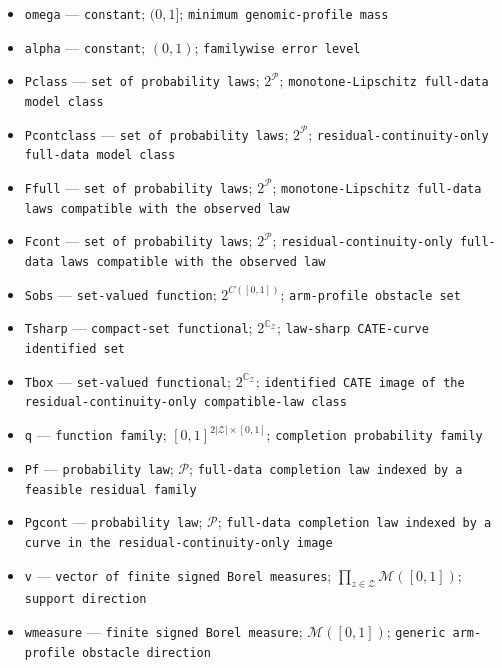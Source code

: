 \documentclass{article}
\begin{document}
\begin{itemize}
  \item \texttt{omega} --- \texttt{constant}; \((0,1]\); \texttt{minimum genomic-\allowbreak{}profile mass}
  \item \texttt{alpha} --- \texttt{constant}; \((0,1)\); \texttt{familywise error level}
  \item \texttt{Pclass} --- \texttt{set of probability laws}; \(2^{\mathcal P}\); \texttt{monotone-\allowbreak{}Lipschitz full-\allowbreak{}data model class}
  \item \texttt{Pcontclass} --- \texttt{set of probability laws}; \(2^{\mathcal P}\); \texttt{residual-\allowbreak{}continuity-\allowbreak{}only full-\allowbreak{}data model class}
  \item \texttt{Ffull} --- \texttt{set of probability laws}; \(2^{\mathcal P}\); \texttt{monotone-\allowbreak{}Lipschitz full-\allowbreak{}data laws compatible with the observed law}
  \item \texttt{Fcont} --- \texttt{set of probability laws}; \(2^{\mathcal P}\); \texttt{residual-\allowbreak{}continuity-\allowbreak{}only full-\allowbreak{}data laws compatible with the observed law}
  \item \texttt{Sobs} --- \texttt{set-\allowbreak{}valued function}; \(2^{C([0,1])}\); \texttt{arm-\allowbreak{}profile obstacle set}
  \item \texttt{Tsharp} --- \texttt{compact-\allowbreak{}set functional}; \(2^{\mathbb C_{\mathcal Z}}\); \texttt{law-\allowbreak{}sharp CATE-\allowbreak{}curve identified set}
  \item \texttt{Tbox} --- \texttt{set-\allowbreak{}valued functional}; \(2^{\mathbb C_{\mathcal Z}}\); \texttt{identified CATE image of the residual-\allowbreak{}continuity-\allowbreak{}only compatible-\allowbreak{}law class}
  \item \texttt{q} --- \texttt{function family}; \([0,1]^{2|\mathcal Z|\times[0,1]}\); \texttt{completion probability family}
  \item \texttt{Pf} --- \texttt{probability law}; \(\mathcal P\); \texttt{full-\allowbreak{}data completion law indexed by a feasible residual family}
  \item \texttt{Pgcont} --- \texttt{probability law}; \(\mathcal P\); \texttt{full-\allowbreak{}data completion law indexed by a curve in the residual-\allowbreak{}continuity-\allowbreak{}only image}
  \item \texttt{v} --- \texttt{vector of finite signed Borel measures}; \(\prod_{z\in\mathcal Z}\mathcal M([0,1])\); \texttt{support direction}
  \item \texttt{wmeasure} --- \texttt{finite signed Borel measure}; \(\mathcal M([0,1])\); \texttt{generic arm-\allowbreak{}profile obstacle direction}

\end{itemize}
\end{document}
